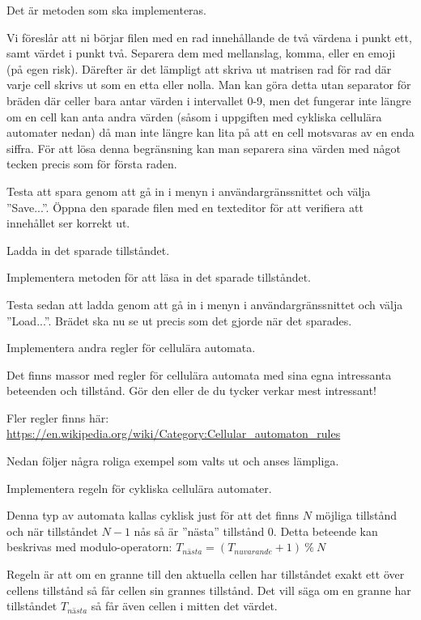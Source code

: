 Det är metoden  som ska implementeras.

Vi föreslår att ni börjar filen med en rad innehållande de två värdena i punkt ett, samt värdet i punkt två. Separera dem med mellanslag, komma, eller en emoji (på egen risk). Därefter är det lämpligt att skriva ut matrisen rad för rad där varje cell skrivs ut som en etta eller nolla. Man kan göra detta utan separator för bräden där celler bara antar värden i intervallet 0-9, men det fungerar inte längre om en cell kan anta andra värden (såsom i uppgiften med cykliska cellulära automater nedan) då man inte längre kan lita på att en cell motsvaras av en enda siffra. För att lösa denna begränsning kan man separera sina värden med något tecken precis som för första raden.

Testa att spara genom att gå in i menyn i användargränssnittet och välja ''Save...''. Öppna den sparade filen med en texteditor för att verifiera att innehållet ser korrekt ut.

\Subtask Ladda in det sparade tillståndet.

Implementera metoden  för att läsa in det sparade tillståndet.

Testa sedan att ladda genom att gå in i menyn i användargränssnittet och välja ''Load...''. Brädet ska nu se ut precis som det gjorde när det sparades.

\Task Implementera andra regler för cellulära automata.

Det finns massor med regler för cellulära automata med sina egna intressanta beteenden och tillstånd.
Gör den eller de du tycker verkar mest intressant!

Fler regler finns här: \url{https://en.wikipedia.org/wiki/Category:Cellular_automaton_rules}

Nedan följer några roliga exempel som valts ut och anses lämpliga.

\Subtask Implementera regeln för cykliska cellulära automater.

Denna typ av automata kallas cyklisk just för att det finns $N$ möjliga tillstånd och när tillståndet $N-1$ nås så är ''nästa'' tillstånd $0$.
Detta beteende kan beskrivas med modulo-operatorn: $T_{nästa} = (T_{nuvarande} + 1)\ \%\ N$

Regeln är att om en granne till den aktuella cellen har tillståndet exakt ett över cellens tillstånd så får cellen sin grannes tillstånd. Det vill säga om en granne har tillståndet $T_{nästa}$ så får även cellen i mitten det värdet.


